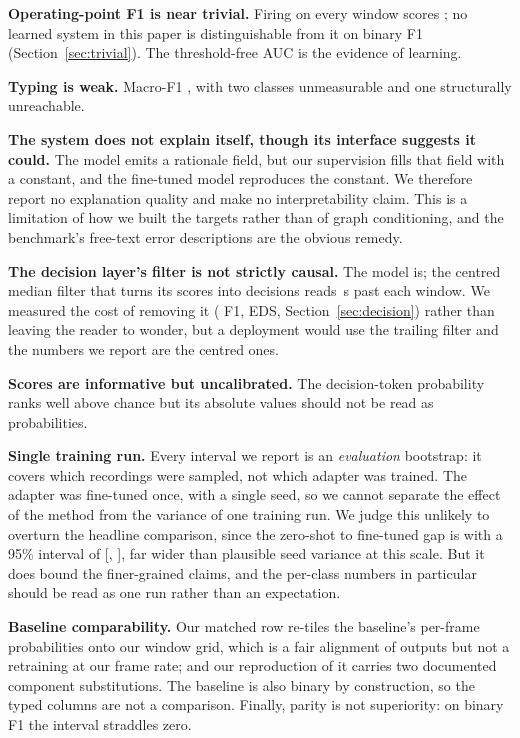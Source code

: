 \documentclass[10pt,twocolumn]{article}
\begin{document}
\textbf{Operating-point F1 is near trivial.} Firing on every window scores
\afF{}; no learned system in this paper is distinguishable from it on binary F1
(Section~\ref{sec:trivial}). The threshold-free AUC is the evidence of learning.

\textbf{Typing is weak.} Macro-F1 \resMacro{}, with two classes unmeasurable and
one structurally unreachable.

\textbf{The system does not explain itself, though its interface suggests it
could.} The model emits a rationale field, but our supervision fills that field
with a constant, and the fine-tuned model reproduces the constant. We therefore
report no explanation quality and make no interpretability claim. This is a
limitation of how we built the targets rather than of graph conditioning, and
the benchmark's free-text error descriptions are the obvious remedy.

\textbf{The decision layer's filter is not strictly causal.} The model is; the
centred median filter that turns its scores into decisions reads \csLook{}\,s
past each window. We measured the cost of removing it (\csDelta{} F1,
\csEdsDelta{} EDS, Section~\ref{sec:decision}) rather than leaving the reader to
wonder, but a deployment would use the trailing filter and the numbers we report
are the centred ones.

\textbf{Scores are informative but uncalibrated.} The decision-token probability
ranks well above chance but its absolute values should not be read as
probabilities.

\textbf{Single training run.} Every interval we report is an \emph{evaluation}
bootstrap: it covers which recordings were sampled, not which adapter was
trained. The adapter was fine-tuned once, with a single seed, so we cannot
separate the effect of the method from the variance of one training run. We
judge this unlikely to overturn the headline comparison, since the zero-shot to
fine-tuned gap is \resDelta{} with a 95\% interval of [\resDeltaLo{},
\resDeltaHi{}], far wider than plausible seed variance at this scale. But it
does bound the finer-grained claims, and the per-class numbers in particular
should be read as one run rather than an expectation.

\textbf{Baseline comparability.} Our matched row re-tiles the baseline's
per-frame probabilities onto our window grid, which is a fair alignment of
outputs but not a retraining at our frame rate; and our reproduction of it
carries two documented component substitutions. The baseline is also binary by
construction, so the typed columns are not a comparison. Finally, parity is not
superiority: on binary F1 the interval straddles zero.
\end{document}
